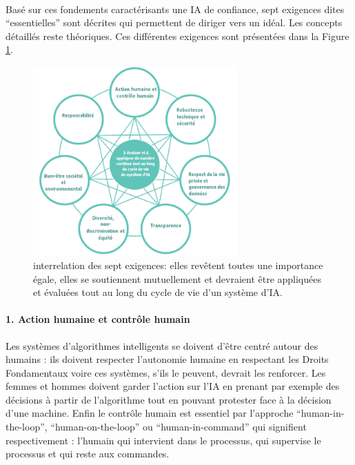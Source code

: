 \documentclass[10pt, french, a4paper]{report}
\begin{document}
\paragraph{}
Basé sur ces fondements caractérisants une IA de confiance, sept exigences dites ``essentielles'' sont décrites qui permettent de diriger vers un idéal. Les concepts détaillés reste théoriques. Ces différentes exigences sont présentées dans la Figure \ref{fig:7_exigences}.

\begin{figure}[hbt!]
  \centering
  \includegraphics[width=0.7\textwidth]{images/7_exigences_commission.png}
  \caption{interrelation des sept exigences: elles revêtent toutes une importance égale, elles se soutiennent mutuellement et devraient être appliquées et évaluées tout au long du cycle de vie d’un système d’IA. \citep{commission_europeenne_ethics_2019}}
  \label{fig:7_exigences}
\end{figure}

\paragraph{1. Action humaine et contrôle humain} Les systèmes d'algorithmes intelligents se doivent d'être centré autour des humains : ils doivent respecter l'autonomie humaine en respectant les Droits Fondamentaux voire ces systèmes, s'ils le peuvent, devrait les renforcer. Les femmes et hommes doivent garder l'action sur l'IA en prenant par exemple des décisions à partir de l'algorithme tout en pouvant protester face à la décision d'une machine. Enfin le contrôle humain est essentiel par l'approche ``human-in-the-loop'', ``human-on-the-loop'' ou ``human-in-command'' qui signifient respectivement : l'humain qui intervient dans le processus, qui supervise le processus et qui reste aux commandes. 
\end{document}
